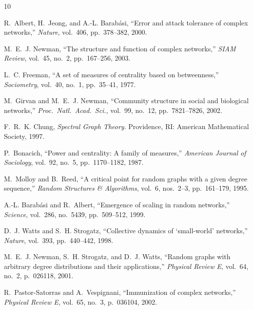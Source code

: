 \documentclass[journal]{IEEEtran}
\begin{document}

\begin{thebibliography}{10}

R.~Albert, H.~Jeong, and A.-L. Barab\'asi,
``Error and attack tolerance of complex networks,''
\emph{Nature}, vol.~406, pp.~378--382, 2000.

M.~E.~J. Newman,
``The structure and function of complex networks,''
\emph{SIAM Review}, vol.~45, no.~2, pp.~167--256, 2003.

L.~C. Freeman,
``A set of measures of centrality based on betweenness,''
\emph{Sociometry}, vol.~40, no.~1, pp.~35--41, 1977.

M.~Girvan and M.~E.~J. Newman,
``Community structure in social and biological networks,''
\emph{Proc.\ Natl.\ Acad.\ Sci.}, vol.~99, no.~12, pp.~7821--7826, 2002.

F.~R.~K. Chung,
\emph{Spectral Graph Theory}.
Providence, RI: American Mathematical Society, 1997.

P.~Bonacich,
``Power and centrality: A family of measures,''
\emph{American Journal of Sociology}, vol.~92, no.~5, pp.~1170--1182, 1987.

M.~Molloy and B.~Reed,
``A critical point for random graphs with a given degree sequence,''
\emph{Random Structures \& Algorithms}, vol.~6, nos.~2--3, pp.~161--179, 1995.

A.-L. Barab\'asi and R.~Albert,
``Emergence of scaling in random networks,''
\emph{Science}, vol.~286, no.~5439, pp.~509--512, 1999.

D.~J. Watts and S.~H. Strogatz,
``Collective dynamics of `small-world' networks,''
\emph{Nature}, vol.~393, pp.~440--442, 1998.

M.~E.~J. Newman, S.~H. Strogatz, and D.~J. Watts,
``Random graphs with arbitrary degree distributions and their applications,''
\emph{Physical Review E}, vol.~64, no.~2, p.~026118, 2001.

R.~Pastor-Satorras and A.~Vespignani,
``Immunization of complex networks,''
\emph{Physical Review E}, vol.~65, no.~3, p.~036104, 2002.

\end{thebibliography}
\end{document}
